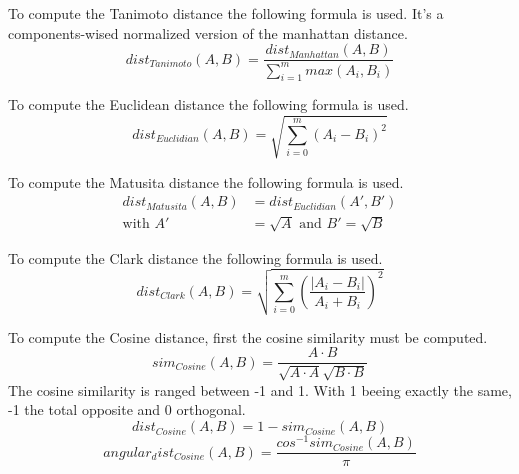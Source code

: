 \begin{definition}
  To compute the Tanimoto distance the following formula is used.
  It's a components-wised normalized version of the manhattan distance.
  \begin{equation}
    dist_{Tanimoto}(A, B) = \frac{dist_{Manhattan}(A, B)}{\sum_{i=1}^{m} max(A_i, B_i)}
  \end{equation}
\end{definition}

\begin{definition}
  To compute the Euclidean distance the following formula is used.
  \begin{equation}
    dist_{Euclidian}(A, B) = \sqrt{\sum_{i=0}^{m}(A_i - B_i)^2}
  \end{equation}
\end{definition}

\begin{definition}
  To compute the Matusita distance the following formula is used.
  \begin{equation}
    \begin{split}
      dist_{Matusita}(A, B) &= dist_{Euclidian}(A', B') \\
      \text{with }A' &= \sqrt{A}\text{ and }B' = \sqrt{B}
    \end{split}
  \end{equation}
\end{definition}

\begin{definition}
  To compute the Clark distance the following formula is used.
  \begin{equation}
    dist_{Clark}(A, B) = \sqrt{\sum_{i=0}^{m}\left(\frac{|A_i - B_i|}{A_i + B_i}\right)^2}
  \end{equation}
\end{definition}

\begin{definition}
  To compute the Cosine distance, first the cosine similarity must be computed.
  \begin{equation}
    sim_{Cosine}(A, B) = \frac{A \cdot B}{\sqrt{A \cdot A}\sqrt{B \cdot B}}
  \end{equation}
  The cosine similarity is ranged between -1 and 1.
  With 1 beeing exactly the same, -1 the total opposite and 0 orthogonal.
  \begin{equation}
    dist_{Cosine}(A, B) = 1 - sim_{Cosine}(A, B)
  \end{equation}
  \begin{equation}
    angular_dist_{Cosine}(A, B) = \frac{cos^{-1}sim_{Cosine}(A, B)}{\pi}
  \end{equation}
\end{definition}

